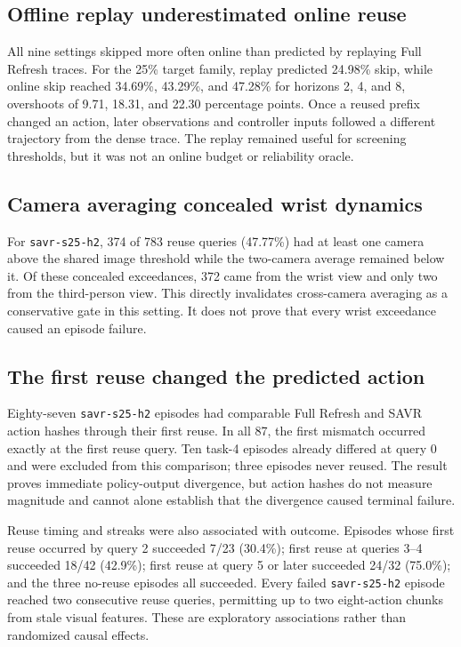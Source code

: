 \documentclass[11pt]{article}
\newcommand{\code}[1]{\texttt{#1}}
\begin{document}
\subsection{Offline replay underestimated online reuse}

All nine settings skipped more often online than predicted by replaying Full Refresh traces. For the 25\% target family, replay predicted 24.98\% skip, while online skip reached 34.69\%, 43.29\%, and 47.28\% for horizons 2, 4, and 8, overshoots of 9.71, 18.31, and 22.30 percentage points. Once a reused prefix changed an action, later observations and controller inputs followed a different trajectory from the dense trace. The replay remained useful for screening thresholds, but it was not an online budget or reliability oracle.

\subsection{Camera averaging concealed wrist dynamics}

For \code{savr-s25-h2}, 374 of 783 reuse queries (47.77\%) had at least one camera above the shared image threshold while the two-camera average remained below it. Of these concealed exceedances, 372 came from the wrist view and only two from the third-person view. This directly invalidates cross-camera averaging as a conservative gate in this setting. It does not prove that every wrist exceedance caused an episode failure.

\subsection{The first reuse changed the predicted action}

Eighty-seven \code{savr-s25-h2} episodes had comparable Full Refresh and SAVR action hashes through their first reuse. In all 87, the first mismatch occurred exactly at the first reuse query. Ten task-4 episodes already differed at query 0 and were excluded from this comparison; three episodes never reused. The result proves immediate policy-output divergence, but action hashes do not measure magnitude and cannot alone establish that the divergence caused terminal failure.

Reuse timing and streaks were also associated with outcome. Episodes whose first reuse occurred by query 2 succeeded 7/23 (30.4\%); first reuse at queries 3--4 succeeded 18/42 (42.9\%); first reuse at query 5 or later succeeded 24/32 (75.0\%); and the three no-reuse episodes all succeeded. Every failed \code{savr-s25-h2} episode reached two consecutive reuse queries, permitting up to two eight-action chunks from stale visual features. These are exploratory associations rather than randomized causal effects.
\end{document}
